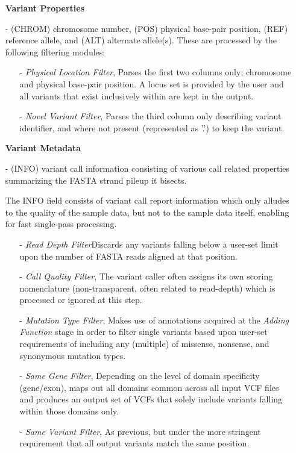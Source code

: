 \documentclass{bioinfo}
\begin{document}
\begin{methods}
\begin{enumerate}
\item[]{\bf Variant Properties}{ - (CHROM) chromosome number, (POS) physical base-pair position, (REF) reference allele, and (ALT) alternate allele(s). These are processed by the following filtering modules:
\vspace{-5pt}
\begin{itemize}
	\item[-]{\it Physical Location Filter}{, Parses the first two columns only; chromosome and physical base-pair position. A locus set is provided by the user and all variants that exist inclusively within are kept in the output.}
	\item[-]{\it Novel Variant Filter}{, Parses the third column only describing variant identifier, and where not present (represented as '.') to keep the variant.}
	\end{itemize}
}

\item[]{\bf Variant Metadata}{ - (INFO) variant call information consisting of various call related properties summarizing the FASTA strand pileup it bisects.

	The INFO field consists of variant call report information which only alludes to the quality of the sample data, but not to the sample data itself, enabling for fast single-pass processing.

	\begin{itemize}
	\item[-]{\it Read Depth Filter}{Discards any variants falling below a user-set limit upon the number of FASTA reads aligned at that position.}
	\item[-]{\it Call Quality Filter}{, The variant caller often assigns its own scoring nomenclature (non-transparent, often related to read-depth) which is processed or ignored at this step.}
	\item[-]{\it Mutation Type Filter}{, Makes use of annotations acquired at the \textit{Adding Function} stage in order to filter single variants based upon user-set requirements of including any (multiple) of missense, nonsense, and synonymous mutation types.}
	\item[-]{\it Same Gene Filter}{, Depending on the level of domain specificity (gene/exon), maps out all domains common across all input VCF files and produces an output set of VCFs that solely include variants falling within those domains only.}
	\item[-]{\it Same Variant Filter}{, As previous, but under the more stringent requirement that all output variants match the same position.}


\end{itemize}}
\end{enumerate}
\end{methods}
\end{document}
